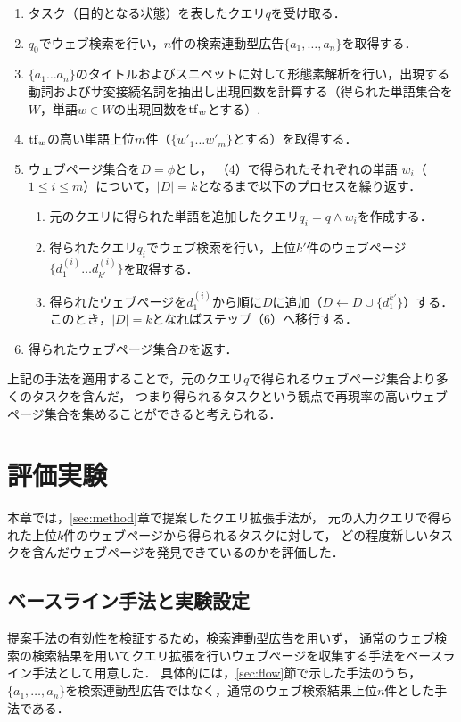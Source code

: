 \documentclass[submit,techreq]{ipsj}
\begin{document}
\begin{enumerate}
\item タスク（目的となる状態）を表したクエリ$q$を受け取る．
\item $q_{0}$でウェブ検索を行い，$n$件の検索連動型広告$\{ a_{1}, \ldots, a_{n} \}$を取得する．
\item $\{ a_{1} \ldots a_{n} \}$のタイトルおよびスニペットに対して形態素解析を行い，出現する動詞およびサ変接続名詞を抽出し出現回数を計算する（得られた単語集合を$W$，単語$w \in W$の出現回数を${\rm tf}_{w}$とする）.
\item ${\rm tf}_{w}$の高い単語上位$m$件（$\{ w'_{1} \ldots w'_{m} \}$とする）を取得する．
\item ウェブページ集合を$D = \phi$とし， （4）で得られたそれぞれの単語 $w_{i}$（$1 \leq i \leq m$）について，$|D|=k$となるまで以下のプロセスを繰り返す．
\begin{enumerate}
\item 元のクエリに得られた単語を追加したクエリ$q_{i} = q \wedge w_{i}$を作成する．
\item 得られたクエリ$q_{i}$でウェブ検索を行い，上位$k'$件のウェブページ$\{ d_{1}^{(i)} \ldots d_{k'}^{(i)} \}$を取得する．
\item 得られたウェブページを$d_{1}^{(i)}$から順に$D$に追加（$D \leftarrow D \cup \{ d_{1}^{k'} \}$）する．
このとき，$|D| = k$となればステップ（6）へ移行する．
\end{enumerate}
\item 得られたウェブページ集合$D$を返す．
\end{enumerate}


上記の手法を適用することで，元のクエリ$q$で得られるウェブページ集合より多くのタスクを含んだ，
つまり得られるタスクという観点で再現率の高いウェブページ集合を集めることができると考えられる．




\section{評価実験}
\label{sec:evaluate}

本章では，\ref{sec:method}章で提案したクエリ拡張手法が，
元の入力クエリで得られた上位$k$件のウェブページから得られるタスクに対して，
どの程度新しいタスクを含んだウェブページを発見できているのかを評価した．

\subsection{ベースライン手法と実験設定}
提案手法の有効性を検証するため，検索連動型広告を用いず，
通常のウェブ検索の検索結果を用いてクエリ拡張を行いウェブページを収集する手法をベースライン手法として用意した．
具体的には，\ref{sec:flow}節で示した手法のうち，$\{a_{1}, \ldots, a_{n} \}$を検索連動型広告ではなく，通常のウェブ検索結果上位$n$件とした手法である．
\end{document}
